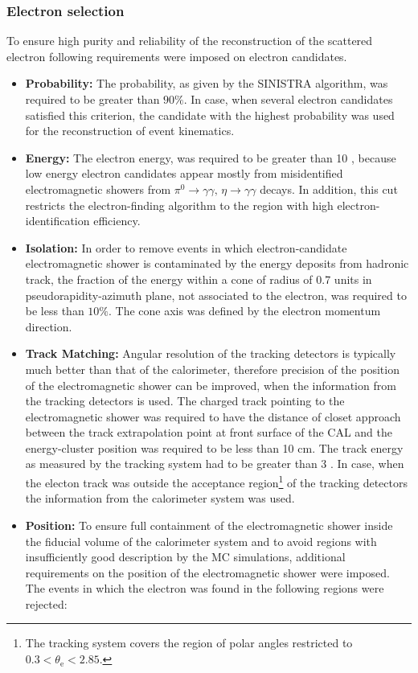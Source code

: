 \subsubsection{Electron selection}
\label{subsubsec:eleselect}

To ensure high purity and reliability of the reconstruction of the scattered electron following requirements were imposed on electron candidates.
\begin{itemize}
	\item \textbf{Probability:} The probability, as given by the SINISTRA algorithm, was required to be greater than $90\%$. In case, when several electron candidates satisfied this criterion, the candidate with the highest probability was used for the reconstruction of event kinematics.
	\item \textbf{Energy:} The electron energy, \eefin was required to be greater than 10 \GeV, because low energy electron candidates appear mostly from misidentified electromagnetic showers from $\pi^0\rightarrow\gamma\gamma,\, \eta\rightarrow\gamma\gamma$ decays. In addition, this cut restricts the electron-finding algorithm to the region with high electron-identification efficiency.
	\item \textbf{Isolation:} In order to remove events in which electron-candidate electromagnetic shower is contaminated by the energy deposits from hadronic track, the fraction of the energy within a cone of radius of 0.7 units in pseudorapidity-azimuth plane, not associated to the electron, was required to be less than $10\%$. The cone axis was defined by the electron momentum direction.
	\item \textbf{Track Matching:} Angular resolution of the tracking detectors is typically much better than that of the calorimeter, therefore precision of the position of the electromagnetic shower can be improved, when the information from the tracking detectors is used. The charged track pointing to the electromagnetic shower was required to have the distance of closet approach between the track extrapolation point at front surface of the CAL and the energy-cluster position was required to be less than 10 cm. The track energy as measured by the tracking system had to be greater than 3 \GeV. In case, when the electon track was outside the acceptance region\footnote{The tracking system covers the region of polar angles restricted to $0.3 < \theta_\text{e} < 2.85$. } of the tracking detectors the information from the calorimeter system was used.
	\item \textbf{Position:} To ensure full containment of the electromagnetic shower inside the fiducial volume of the calorimeter system and to avoid regions with insufficiently good description by the MC simulations, additional requirements on the position of the electromagnetic shower were imposed. The events in which the electron was found in the following regions were rejected:

\end{itemize}
